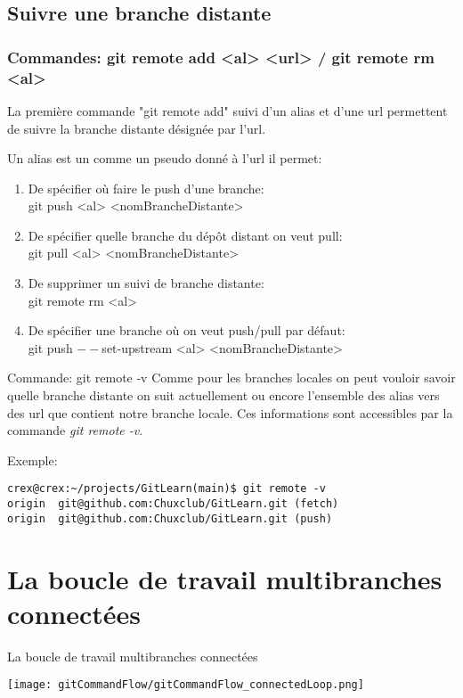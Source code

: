 \documentclass{beamer}
\begin{document}
\subsection{Suivre une branche distante}
\begin{frame}
\frametitle{Commandes: git remote add <al> <url> / git remote rm <al>}
La première commande "git remote add" suivi d'un alias et d'une url permettent de suivre la branche distante désignée par l'url.\\
\smallskip

Un alias est un comme un pseudo donné à l'url il permet:
\begin{enumerate}
    \item De spécifier où faire le push d'une branche:\\ git push <al> <nomBrancheDistante>
    \item De spécifier quelle branche du dépôt distant on veut pull:\\ git pull <al> <nomBrancheDistante>
    \item De supprimer un suivi de branche distante:\\ git remote rm <al>
    \item De spécifier une branche où on veut push/pull par défaut:\\ git push $--$set-upstream <al> <nomBrancheDistante>
\end{enumerate}
\end{frame}

\begin{frame}[fragile]{Commande: git remote -v}
Comme pour les branches locales on peut vouloir savoir quelle branche distante on suit actuellement ou encore l'ensemble des alias vers des url que contient notre branche locale. Ces informations sont accessibles par la commande \textit{git remote -v}.
\medskip

Exemple:
\begin{mdframed}[style=Bash]
\begin{lstlisting}[style=Bash, caption=Exemple d'output de la commande git remote -v]
crex@crex:~/projects/GitLearn(main)$ git remote -v
origin	git@github.com:Chuxclub/GitLearn.git (fetch)
origin	git@github.com:Chuxclub/GitLearn.git (push)
\end{lstlisting}
\end{mdframed}

\end{frame}



\section{La boucle de travail multibranches connectées}

\begin{frame}{La boucle de travail multibranches connectées}
\begin{center}
	\texttt{[image: gitCommandFlow/gitCommandFlow\_connectedLoop.png]}
\end{center}
\end{frame}
\end{document}
